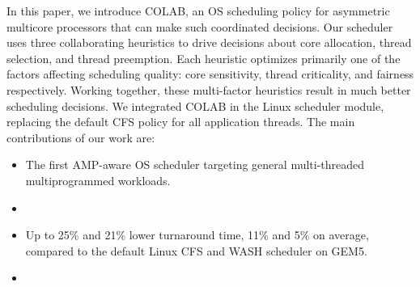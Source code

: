 In this paper, we introduce COLAB, an OS scheduling policy for asymmetric multicore processors that can make such coordinated decisions. Our scheduler uses three collaborating heuristics to drive decisions about core allocation, thread selection, and thread preemption. Each heuristic optimizes primarily one of the factors affecting scheduling quality: core sensitivity, thread criticality, and fairness respectively. Working together, these multi-factor heuristics result in much better scheduling decisions.
We integrated COLAB in the Linux scheduler module, replacing the default CFS policy for all application threads.
The main contributions of our work are:
\begin{itemize}
\item  The first AMP-aware OS scheduler targeting general multi-threaded multiprogrammed workloads.
\item {}
\item Up to 25\% and 21\% lower turnaround time, 11\% and 5\% on average, compared to the default Linux CFS and WASH scheduler on GEM5. 
\item {}
\end{itemize}

